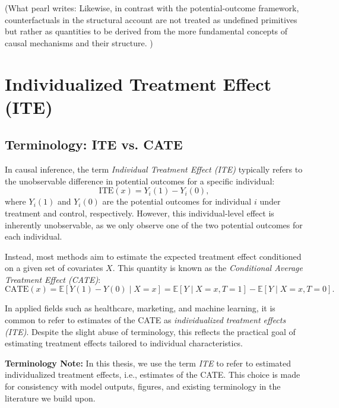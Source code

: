 (What pearl writes:  Likewise, in contrast with the potential-outcome framework, counterfactuals in the structural account are not treated as undefined primitives but rather as quantities to be derived from the more fundamental concepts of causal mechanisms and their structure. )





\section{Individualized Treatment Effect (ITE)} \label{sec:methods_ite}


\subsection{Terminology: ITE vs. CATE}

In causal inference, the term \emph{Individual Treatment Effect (ITE)} typically refers to the unobservable difference in potential outcomes for a specific individual:
\begin{equation}
    \text{ITE}(x) = Y_i(1) - Y_i(0),
\end{equation}
where $Y_i(1)$ and $Y_i(0)$ are the potential outcomes for individual $i$ under treatment and control, respectively. However, this individual-level effect is inherently unobservable, as we only observe one of the two potential outcomes for each individual.

Instead, most methods aim to estimate the expected treatment effect conditioned on a given set of covariates $X$. This quantity is known as the \emph{Conditional Average Treatment Effect (CATE)}:
\begin{equation}
    \text{CATE}(x) = \mathbb{E}[Y(1) - Y(0) \mid X = x] = \mathbb{E}[Y \mid X = x, T = 1] - \mathbb{E}[Y \mid X = x, T = 0].
\end{equation}

In applied fields such as healthcare, marketing, and machine learning, it is common to refer to estimates of the CATE as \emph{individualized treatment effects (ITE)}. Despite the slight abuse of terminology, this reflects the practical goal of estimating treatment effects tailored to individual characteristics.

\bigskip

\noindent\textbf{Terminology Note:} In this thesis, we use the term \emph{ITE} to refer to estimated individualized treatment effects, i.e., estimates of the CATE. This choice is made for consistency with model outputs, figures, and existing terminology in the literature we build upon.



